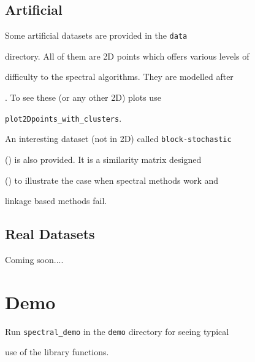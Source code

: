 \documentclass[10pt]{article}
\begin{document}
\label{sec:data}





\subsection{Artificial}

\label{sec:artdata}



Some artificial datasets are provided in the \texttt{data}

directory. All of them are 2D points which offers various levels of

difficulty to the spectral algorithms. They are modelled after

\cite{NgJW01}. To see these (or any other 2D) plots use

\texttt{plot2Dpoints\_with\_clusters}. 



An interesting dataset (not in 2D) called \texttt{block-stochastic}

(\cite{MeilaS00}) is also provided. It is a similarity matrix designed

(\cite{VM03}) to illustrate the case when spectral methods work and

linkage based methods fail. 



\subsection{Real Datasets}

\label{sec:realdata}



Coming soon....



\section{Demo}



Run \texttt{spectral\_demo} in the \texttt{demo} directory for seeing typical

use of the library functions.   

\small{

  

  

}
\end{document}

